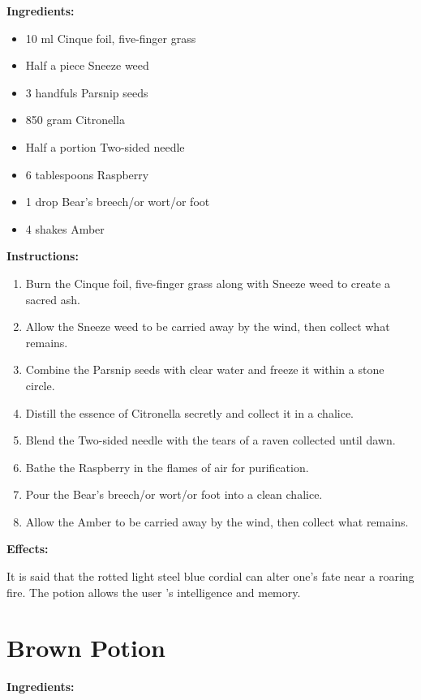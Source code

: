 \documentclass{article}
\begin{document}
\textbf{Ingredients:}

\begin{itemize}
  \item 10 ml Cinque foil, five-finger grass
  \item Half a piece Sneeze weed
  \item 3 handfuls Parsnip seeds
  \item 850 gram Citronella
  \item Half a portion Two-sided needle
  \item 6 tablespoons Raspberry
  \item 1 drop Bear's breech/or wort/or foot
  \item 4 shakes Amber
\end{itemize}

\textbf{Instructions:}

\begin{enumerate}
  \item Burn the Cinque foil, five-finger grass along with Sneeze weed to create a sacred ash.
  \item Allow the Sneeze weed to be carried away by the wind, then collect what remains.
  \item Combine the Parsnip seeds with clear water and freeze it within a stone circle.
  \item Distill the essence of Citronella secretly and collect it in a chalice.
  \item Blend the Two-sided needle with the tears of a raven collected until dawn.
  \item Bathe the Raspberry in the flames of air for purification.
  \item Pour the Bear's breech/or wort/or foot into a clean chalice.
  \item Allow the Amber to be carried away by the wind, then collect what remains.
\end{enumerate}

\textbf{Effects:}

It is said that the rotted light steel blue cordial can alter one's fate near a roaring fire. The potion allows the user 's intelligence and memory.

\newpage
\section*{Brown Potion}

\textbf{Ingredients:}
\end{document}
